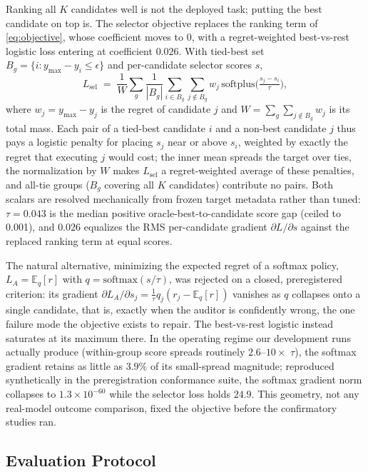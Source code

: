 Ranking all $K$ candidates well is not the deployed task; putting the best candidate on top is.
The selector objective replaces the ranking term of \cref{eq:objective}, whose coefficient moves to 0, with a regret-weighted best-vs-rest logistic loss entering at coefficient $0.026$.
With tied-best set $B_g=\{i: y_{\max}-y_i\le\epsilon\}$ and per-candidate selector scores $s$,
\begin{equation}
  L_{\text{sel}} \;=\; \frac{1}{W}\sum_{g}\frac{1}{|B_g|}\sum_{i\in B_g}\sum_{j\notin B_g} w_j\,
  \mathrm{softplus}\!\big(\tfrac{s_j-s_i}{\tau}\big),
  \label{eq:selloss}
\end{equation}
where $w_j = y_{\max}-y_j$ is the regret of candidate $j$ and $W=\sum_g \sum_{j\notin B_g} w_j$ is its total mass.
Each pair of a tied-best candidate $i$ and a non-best candidate $j$ thus pays a logistic penalty for placing $s_j$ near or above $s_i$, weighted by exactly the regret that executing $j$ would cost; the inner mean spreads the target over ties, the normalization by $W$ makes $L_{\text{sel}}$ a regret-weighted average of these penalties, and all-tie groups ($B_g$ covering all $K$ candidates) contribute no pairs.
Both scalars are resolved mechanically from frozen target metadata rather than tuned: $\tau=0.043$ is the median positive oracle-best-to-candidate score gap (ceiled to 0.001), and $0.026$ equalizes the RMS per-candidate gradient $\partial L/\partial s$ against the replaced ranking term at equal scores.

The natural alternative, minimizing the expected regret of a softmax policy, $L_A=\mathbb{E}_{q}[r]$ with $q=\mathrm{softmax}(s/\tau)$, was rejected on a closed, preregistered criterion: its gradient $\partial L_A/\partial s_j = \tfrac{1}{\tau}q_j(r_j-\mathbb{E}_q[r])$ vanishes as $q$ collapses onto a single candidate, that is, exactly when the auditor is confidently wrong, the one failure mode the objective exists to repair.
The best-vs-rest logistic instead saturates at its maximum there.
In the operating regime our development runs actually produce (within-group score spreads routinely $2.6$--$10\times$ $\tau$), the softmax gradient retains as little as $3.9\%$ of its small-spread magnitude; reproduced synthetically in the preregistration conformance suite, the softmax gradient norm collapses to $1.3\times 10^{-60}$ while the selector loss holds $24.9$.
This geometry, not any real-model outcome comparison, fixed the objective before the confirmatory studies ran.

\subsection{Evaluation Protocol}
\label{sec:protocol}

